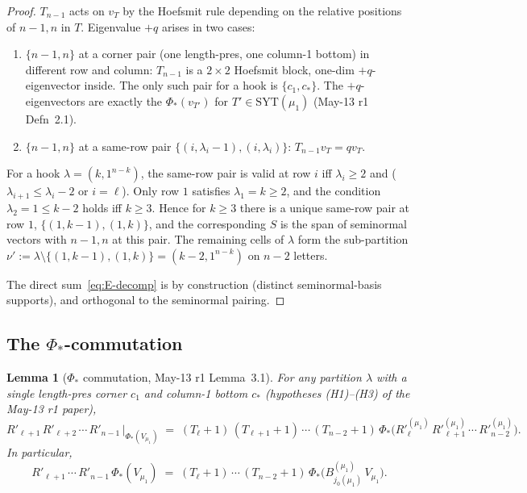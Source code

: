 \documentclass[11pt]{article}
\newtheorem{lemma}[theorem]{Lemma}
\theoremstyle{definition}
\begin{document}
\begin{proof}
$T_{n-1}$ acts on $v_T$ by the Hoefsmit rule depending on the relative
positions of $n - 1, n$ in $T$.  Eigenvalue $+q$ arises in two cases:
\begin{enumerate}[leftmargin=2em,topsep=0.2em,itemsep=0.1em,label=(\arabic*)]
\item $\{n-1, n\}$ at a corner pair (one length-pres, one column-1 bottom)
in different row and column: $T_{n-1}$ is a $2 \times 2$ Hoefsmit block,
one-dim $+q$-eigenvector inside.  The only such pair for a hook is
$\{c_1, c_*\}$.  The $+q$-eigenvectors are exactly the $\Phi_*(v_{T'})$
for $T' \in \mathrm{SYT}(\mu_1)$ (May-13 r1 Defn~2.1).
\item $\{n-1, n\}$ at a same-row pair $\{(i, \lambda_i - 1), (i, \lambda_i)\}$:
$T_{n-1} v_T = q v_T$.
\end{enumerate}
For a hook $\lambda = (k, 1^{n-k})$, the same-row pair is valid at row
$i$ iff $\lambda_i \ge 2$ and ($\lambda_{i+1} \le \lambda_i - 2$ or
$i = \ell$).  Only row $1$ satisfies $\lambda_1 = k \ge 2$, and the
condition $\lambda_2 = 1 \le k - 2$ holds iff $k \ge 3$.  Hence
for $k \ge 3$ there is a unique same-row pair at row $1$,
$\{(1, k-1), (1, k)\}$, and the corresponding $S$ is the span of
seminormal vectors with $n-1, n$ at this pair.  The remaining cells of
$\lambda$ form the sub-partition
$\nu' := \lambda \setminus \{(1, k-1), (1, k)\} = (k-2, 1^{n-k})$ on
$n - 2$ letters.

The direct sum~\eqref{eq:E-decomp} is by construction (distinct
seminormal-basis supports), and orthogonal to the seminormal pairing.
\end{proof}

\subsection{The $\Phi_*$-commutation}\label{sec:Phi-commute}

\begin{lemma}[$\Phi_*$ commutation, May-13 r1 Lemma~3.1]\label{lem:Phi-commute}
For any partition $\lambda$ with a single length-pres corner $c_1$ and
column-1 bottom $c_*$ (hypotheses (H1)--(H3) of the May-13 r1 paper),
\[
   R'_{\ell+1}\,R'_{\ell+2}\,\cdots\,R'_{n-1}\,\big|_{\Phi_*(V_{\mu_1})}
   \;=\;
   (T_\ell+1)\,(T_{\ell+1}+1)\,\cdots\,(T_{n-2}+1)\,
   \Phi_*\big(R'^{(\mu_1)}_\ell\,R'^{(\mu_1)}_{\ell+1}\,\cdots\,R'^{(\mu_1)}_{n-2}\big).
\]
In particular,
\[
   R'_{\ell+1}\,\cdots\,R'_{n-1}\,\Phi_*(V_{\mu_1})
   \;=\;
   (T_\ell+1)\,\cdots\,(T_{n-2}+1)\,\Phi_*\big(B^{(\mu_1)}_{j_0(\mu_1)}\,V_{\mu_1}\big).
\]
\end{lemma}
\end{document}
